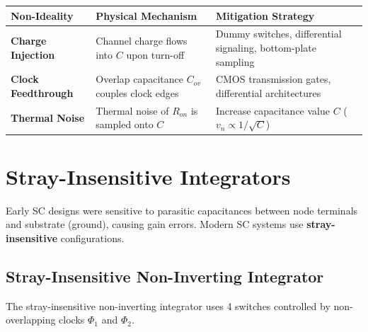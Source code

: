 \documentclass[12pt,a4paper]{article}
\begin{document}
\begin{tcolorbox}[tikzbox, title={Summary of Switch Mitigation Techniques}]
\centering
\par\noindent
\begin{tabularx}{\linewidth}{|B{3.5cm}|Y|Y|}
\hline
\textbf{Non-Ideality} & \textbf{Physical Mechanism} & \textbf{Mitigation Strategy} \\ \hline
\textbf{Charge Injection} & Channel charge flows into $C$ upon turn-off & Dummy switches, differential signaling, bottom-plate sampling \\ \hline
\textbf{Clock Feedthrough} & Overlap capacitance $C_{ov}$ couples clock edges & CMOS transmission gates, differential architectures \\ \hline
\textbf{Thermal Noise} & Thermal noise of $R_{on}$ is sampled onto $C$ & Increase capacitance value $C$ ($v_n \propto 1/\sqrt{C}$) \\ \hline
\end{tabularx}
\end{tcolorbox}

\section{Stray-Insensitive Integrators}

Early SC designs were sensitive to parasitic capacitances between node terminals and substrate (ground), causing gain errors. Modern SC systems use \textbf{stray-insensitive} configurations.

\subsection{Stray-Insensitive Non-Inverting Integrator}
The stray-insensitive non-inverting integrator uses 4 switches controlled by non-overlapping clocks $\Phi_1$ and $\Phi_2$.
\end{document}
